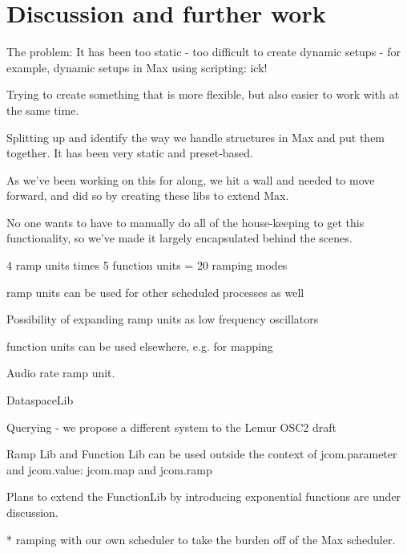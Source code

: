 \documentclass{article}
\begin{document}
\section{Discussion and further work} %
\label{sec:discussion_and_further_work}

The problem: 
It has been too static
    - too difficult to create dynamic setups
    - for example, dynamic setups in Max using scripting: ick!

Trying to create something that is more flexible, but also easier to work with at the same time.

Splitting up and identify the way we handle structures in Max and put them together.  It has been very static and preset-based.

As we've been working on this for along, we hit a wall and needed to move forward, and did so by creating these libs to extend Max.  

No one wants to have to manually do all of the house-keeping to get this functionality, so we've made it largely encapsulated behind the scenes.


\cite{Momeni:2003}



4 ramp units times 5 function units = 20 ramping modes

ramp units can be used for other scheduled processes as well

Possibility of expanding ramp units as low frequency oscillators

function units can be used elsewhere, e.g. for mapping

Audio rate ramp unit.

DataspaceLib

Querying - we propose a different system to the Lemur OSC2 draft

Ramp Lib and Function Lib can be used outside the context of jcom.parameter and jcom.value: jcom.map and jcom.ramp


Plans to extend the FunctionLib by introducing exponential functions are under discussion. %


* ramping with our own scheduler to take the burden off of the Max scheduler.





%
%
%
\end{document}
